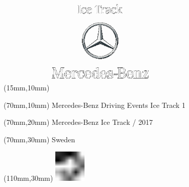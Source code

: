\null\newpage
\begin{textblock*}{50mm}(15mm,10mm)%
\includegraphics[width=50mm]{LG/MER.png}
\end{textblock*}
\begin{textblock*}{130mm}(70mm,10mm)%
{\fontsize{20}{20}\selectfont Mercedes-Benz Driving Events Ice Track 1}\\
\end{textblock*}
\begin{textblock*}{120mm}(70mm,20mm)%
{\fontsize{16}{16}\selectfont Mercedes-Benz Ice Track / 2017}\\
\end{textblock*}
\begin{textblock*}{120mm}(70mm,30mm)%
{\fontsize{12}{12}\selectfont Sweden}
\end{textblock*}
\begin{textblock*}{30mm}(110mm,30mm)%
\centering
\includegraphics[height=15mm]{icons/fa-rotate-left.pdf}
\end{textblock*}
